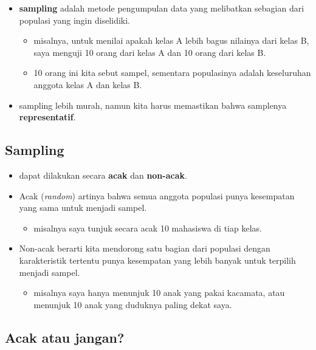 \documentclass[
  letterpaper,
  DIV=11,
  numbers=noendperiod]{scrartcl}
\providecommand{\tightlist}{%
  \setlength{\itemsep}{0pt}\setlength{\parskip}{0pt}}\usepackage{longtable,booktabs,array}
\begin{document}
\begin{itemize}
\item
  \textbf{sampling} adalah metode pengumpulan data yang melibatkan
  sebagian dari populasi yang ingin diselidiki.

  \begin{itemize}
  \item
    misalnya, untuk menilai apakah kelas A lebih bagus nilainya dari
    kelas B, saya menguji 10 orang dari kelas A dan 10 orang dari kelas
    B.
  \item
    10 orang ini kita sebut sampel, sementara populasinya adalah
    keseluruhan anggota kelas A dan kelas B.
  \end{itemize}
\item
  sampling lebih murah, namun kita harus memastikan bahwa samplenya
  \textbf{representatif}.
\end{itemize}

\hypertarget{sampling}{%
\subsection{Sampling}\label{sampling}}

\begin{itemize}
\item
  dapat dilakukan secara \textbf{acak} dan \textbf{non-acak}.
\item
  Acak (\emph{random}) artinya bahwa semua anggota populasi punya
  kesempatan yang sama untuk menjadi sampel.

  \begin{itemize}
  \tightlist
  \item
    misalnya saya tunjuk secara acak 10 mahasiswa di tiap kelas.
  \end{itemize}
\item
  Non-acak berarti kita mendorong satu bagian dari populasi dengan
  karakteristik tertentu punya kesempatan yang lebih banyak untuk
  terpilih menjadi sampel.

  \begin{itemize}
  \tightlist
  \item
    misalnya saya hanya menunjuk 10 anak yang pakai kacamata, atau
    menunjuk 10 anak yang duduknya paling dekat saya.
  \end{itemize}
\end{itemize}

\hypertarget{acak-atau-jangan}{%
\subsection{Acak atau jangan?}\label{acak-atau-jangan}}
\end{document}
